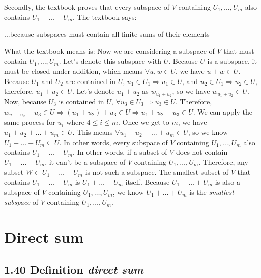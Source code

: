 \documentclass[12pt, letterpaper, oneside]{book}
\begin{document}
Secondly, the textbook proves that every subspace of $V$ containing $U_1,
\ldots, U_m$ also contains $U_1 + \ldots + U_m$. The textbook says:

\begin{displayquote}
  ...because subspaces must contain all finite sums of their elements
\end{displayquote}

What the textbook means is: Now we are considering a subspace of $V$ that
must contain $U_1, \ldots, U_m$. Let's denote this subspace with $U$. Because
$U$ is a subspace, it must be closed under addition, which means $\forall u, w
\in U$, we have $u + w \in U$. Because $U_1$ and $U_2$ are contained in $U$,
$u_1 \in U_1 \Rightarrow u_1 \in U$, and $u_2 \in U_1 \Rightarrow u_2 \in U$,
therefore, $u_1 + u_2 \in U$. Let's denote $u_1 + u_2$ as $w_{u_1+u_2}$, so we
have $w_{u_1+u_2} \in U$. Now, because $U_3$ is contained in $U$, $\forall u_3
\in U_3 \Rightarrow u_3 \in U$. Therefore, $w_{u_1+u_2} + u_3 \in U \Rightarrow
(u_1 + u_2) + u_3 \in U \Rightarrow u_1 + u_2 + u_3 \in U$. We can apply the
same process for $u_i$ where $4 \leq i \leq m$. Once we get to $m$, we have
$u_1 + u_2 + \ldots + u_m \in U$. This means $\forall u_1 + u_2 + \ldots + u_m
\in U$, so we know $U_1 + \ldots + U_m \subseteq U$. In other words, every
subspace of $V$ containing $U_1, \ldots, U_m$ also contains $U_1 + \ldots +
U_m$. In other words, if a subset of $V$ does not contain $U_1 + \ldots + U_m$,
it can't be a subspace of $V$ containing $U_1, \ldots, U_m$. Therefore, any
subset $W \subset U_1 + \ldots + U_m$ is not such a subspace. The smallest
subset of $V$ that contains $U_1 + \ldots + U_m$ is $U_1 + \ldots + U_m$
itself. Because $U_1 + \ldots + U_m$ is also a subspace of $V$ containing $U_1,
\ldots, U_m$, we know $U_1 + \ldots + U_m$ is the \textit{smallest subspace} of
$V$ containing $U_1, \ldots, U_m$.

\section{Direct sum}

\subsection{1.40 Definition \textbf{\textit{direct sum}}}
\end{document}
